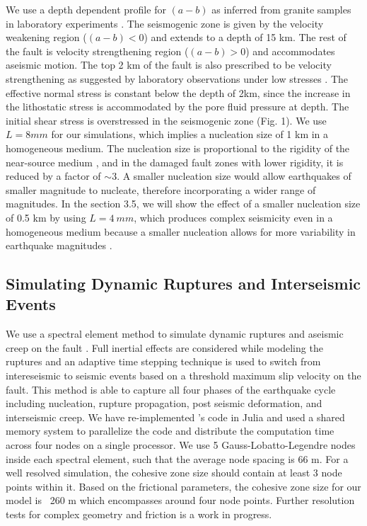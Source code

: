 \documentclass[11pt]{article}
\newcommand{\yihe}[1]{{\color{red}#1}}
\begin{document}
We use a depth dependent profile for $(a-b)$ as inferred from granite samples in laboratory experiments \citep{blanpied_1991, blanpied_1995}. \yihe{The seismogenic zone is given by the velocity weakening region ($(a-b)<0$) and extends to a depth of 15 km. The rest of the fault is velocity strengthening region ($(a-b)>0$) and accommodates aseismic motion. The top 2 km of the fault is also prescribed to be velocity strengthening as suggested by laboratory observations under low stresses \citep{blanpied_1995}. The effective normal stress is constant below the depth of 2km, since the increase in the lithostatic stress is accommodated by the pore fluid pressure at depth. The initial shear stress is overstressed in the seismogenic zone (Fig. 1)}. We use $L = 8mm$ for our simulations, which implies a nucleation size of 1 km in a homogeneous medium. \yihe{The nucleation size is proportional to the rigidity of the near-source medium \citep{rubin_ampuero_2005, kaneko_2011}, and in the damaged fault zones with lower rigidity, it is reduced by a factor of $\sim 3$}. A smaller nucleation size would allow earthquakes of smaller magnitude to nucleate, therefore incorporating a wider range of magnitudes. In the section 3.5, we will show the effect of a smaller nucleation size of 0.5 km by using $L = 4\ mm$, which produces complex seismicity even in a homogeneous medium \yihe{because a smaller nucleation allows for more variability in earthquake magnitudes \citep{lapusta_2000}}. 

\subsection{Simulating Dynamic Ruptures and Interseismic Events}
We use a spectral element method to simulate dynamic ruptures and aseismic creep on the fault \citep{kaneko_2011}. Full inertial effects are considered while modeling the ruptures and an adaptive time stepping technique is used to switch from intereseismic to seismic events based on a threshold maximum slip velocity on the fault. This method is able to capture all four phases of the earthquake cycle including nucleation, rupture propagation, post seismic deformation, and interseismic creep.  We have re-implemented \citep{kaneko_2011}'s code in Julia \citep{bezanson_2017} and used a shared memory system to parallelize the code and distribute the computation time across four nodes on a single processor. We use 5 Gauss-Lobatto-Legendre nodes inside each spectral element, such that the average node spacing is 66 m. For a well resolved simulation, the cohesive zone size \citep{rubin_ampuero_2005,kaneko_2011} should contain at least 3 node points within it. Based on the frictional parameters, the cohesive zone size for our model is ~260 m which encompasses around four node points. Further resolution tests for complex geometry and friction is a work in progress.
\end{document}
